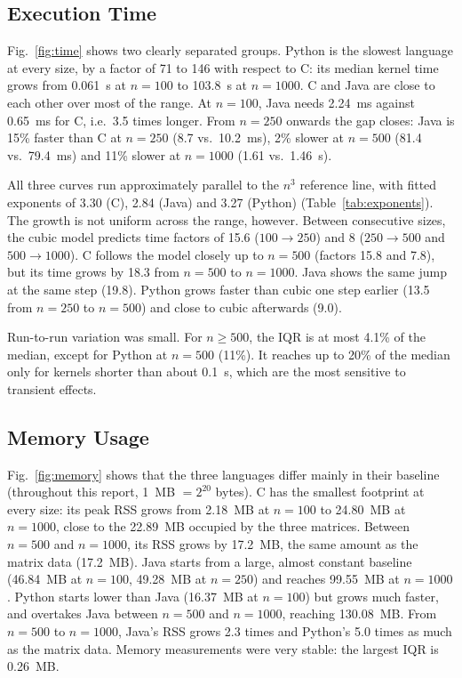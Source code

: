 \documentclass[conference,a4paper]{IEEEtran}
\begin{document}
\subsection{Execution Time}
Fig.~\ref{fig:time} shows two clearly separated groups. Python is the slowest
language at every size, by a factor of 71 to 146 with respect to C: its median
kernel time grows from 0.061~s at $n=100$ to 103.8~s at $n=1000$. C and Java
are close to each other over most of the range. At $n=100$, Java needs 2.24~ms
against 0.65~ms for C, i.e.\ 3.5 times longer. From $n=250$ onwards the gap
closes: Java is 15\% faster than C at $n=250$ (8.7 vs.\ 10.2~ms), 2\% slower at
$n=500$ (81.4 vs.\ 79.4~ms) and 11\% slower at $n=1000$ (1.61 vs.\ 1.46~s).

All three curves run approximately parallel to the $n^3$ reference line, with
fitted exponents of 3.30 (C), 2.84 (Java) and 3.27 (Python)
(Table~\ref{tab:exponents}). The growth is not uniform across the range,
however. Between consecutive sizes, the cubic model predicts time factors of
15.6 ($100 \to 250$) and 8 ($250 \to 500$ and $500 \to 1000$). C follows the
model closely up to $n=500$ (factors 15.8 and 7.8), but its time grows by 18.3
from $n=500$ to $n=1000$. Java shows the same jump at the same step (19.8).
Python grows faster than cubic one step earlier (13.5 from $n=250$ to $n=500$)
and close to cubic afterwards (9.0).

Run-to-run variation was small. For $n \ge 500$, the IQR is at most 4.1\% of
the median, except for Python at $n=500$ (11\%). It reaches up to 20\% of the
median only for kernels shorter than about 0.1~s, which are the most sensitive
to transient effects.

\subsection{Memory Usage}
Fig.~\ref{fig:memory} shows that the three languages differ mainly in their
baseline (throughout this report, 1~MB $= 2^{20}$ bytes). C has the smallest
footprint at every size: its peak RSS grows from 2.18~MB at $n=100$ to
24.80~MB at $n=1000$, close to the 22.89~MB occupied by the three matrices.
Between $n=500$ and $n=1000$, its RSS grows by 17.2~MB, the same amount as
the matrix data (17.2~MB). Java starts from a large, almost constant baseline
(46.84~MB at $n=100$, 49.28~MB at $n=250$) and reaches 99.55~MB at $n=1000$.
Python starts lower than Java (16.37~MB at $n=100$) but grows much faster, and
overtakes Java between $n=500$ and $n=1000$, reaching 130.08~MB. From $n=500$
to $n=1000$, Java's RSS grows 2.3 times and Python's 5.0 times as much as the
matrix data. Memory measurements were very stable: the largest IQR is
0.26~MB.
\end{document}
